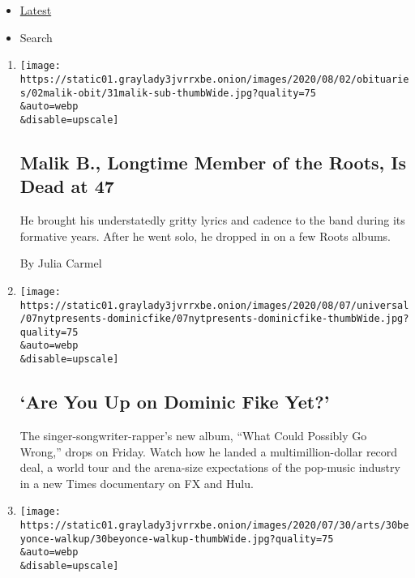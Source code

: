 \begin{itemize}
\tightlist
\item
  \protect\hyperlink{stream-panel}{Latest}
\item
  Search
\end{itemize}

\begin{enumerate}
\def\labelenumi{\arabic{enumi}.}
\item
  \href{/2020/07/31/arts/music/malik-b-dead.html}{}

  \texttt{[image: https://static01.graylady3jvrrxbe.onion/images/2020/08/02/obituaries/02malik-obit/31malik-sub-thumbWide.jpg?quality=75\\\&auto=webp\\\&disable=upscale]}

  \hypertarget{malik-b-longtime-member-of-the-roots-is-dead-at-47}{%
  \subsection{Malik B., Longtime Member of the Roots, Is Dead at
  47}\label{malik-b-longtime-member-of-the-roots-is-dead-at-47}}

  He brought his understatedly gritty lyrics and cadence to the band
  during its formative years. After he went solo, he dropped in on a few
  Roots albums.

  By Julia Carmel
\item
  \href{/article/dominic-fike-at-first.html}{}

  \texttt{[image: https://static01.graylady3jvrrxbe.onion/images/2020/08/07/universal/07nytpresents-dominicfike/07nytpresents-dominicfike-thumbWide.jpg?quality=75\\\&auto=webp\\\&disable=upscale]}

  \hypertarget{are-you-up-on-dominic-fike-yet}{%
  \subsection{`Are You Up on Dominic Fike
  Yet?'}\label{are-you-up-on-dominic-fike-yet}}

  The singer-songwriter-rapper's new album, ``What Could Possibly Go
  Wrong,'' drops on Friday. Watch how he landed a multimillion-dollar
  record deal, a world tour and the arena-size expectations of the
  pop-music industry in a new Times documentary on FX and Hulu.
\item
  \href{/2020/07/30/arts/music/beyonce-black-is-king.html}{}

  \texttt{[image: https://static01.graylady3jvrrxbe.onion/images/2020/07/30/arts/30beyonce-walkup/30beyonce-walkup-thumbWide.jpg?quality=75\\\&auto=webp\\\&disable=upscale]}


\end{enumerate}
